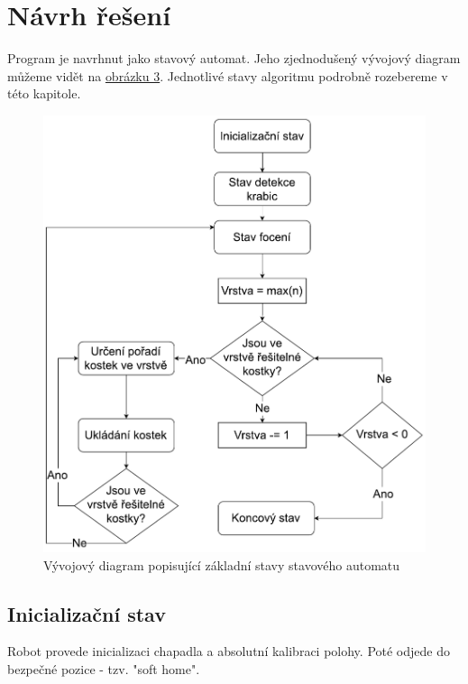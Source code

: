 \documentclass[journal,twoside,web]{ieeecolor}
\begin{document}
    \section{Návrh řešení}
            Program je navrhnut jako stavový automat. Jeho zjednodušený vývojový diagram můžeme vidět na \hyperlink{diagram1}{obrázku 3}.
            Jednotlivé stavy algoritmu podrobně rozebereme v této kapitole.

            \begin{figure}[h!]
                \centering
                \hypertarget{diagram1}{}
                \includegraphics[width=\linewidth]{flowchart_cropped}
                \caption{Vývojový diagram popisující základní stavy stavového automatu}
                \label{fig:flowchart}
            \end{figure}

        \subsection{Inicializační stav}
            Robot provede inicializaci chapadla a absolutní kalibraci polohy. Poté odjede do bezpečné pozice - tzv. "soft home".
\end{document}

